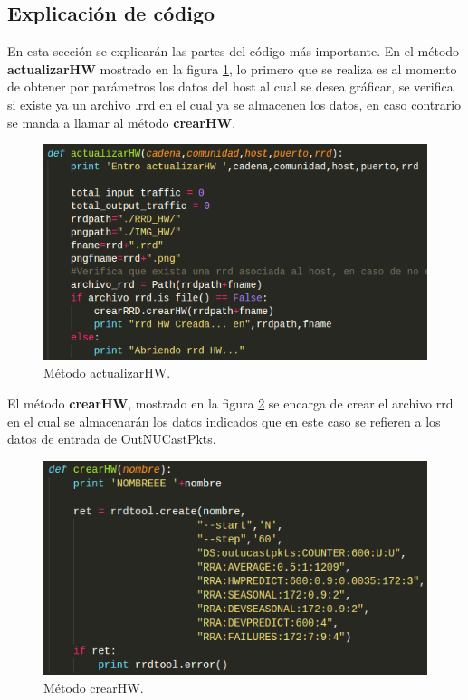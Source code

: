 \subsection{Explicación de código}
En esta sección se explicarán las partes del código más importante. En el método \textbf{actualizarHW} mostrado en la figura \ref{image:codigo4}, lo primero que se realiza es al momento de obtener por parámetros los datos del host al cual se desea gráficar, se verifica si existe ya un archivo .rrd en el cual ya se almacenen los datos, en caso contrario se manda a llamar al método \textbf{crearHW}.
\FloatBarrier
\begin{figure}[htbp!]
		\centering
			\includegraphics[width=.7 \textwidth]{images/codigo4}
		\caption{Método actualizarHW.}
		\label{image:codigo4}
\end{figure}
\FloatBarrier


El método \textbf{crearHW}, mostrado en la figura \ref{image:codigo1} se encarga de crear el archivo rrd en el cual se almacenarán los datos indicados que en este caso se refieren a los datos de entrada de OutNUCastPkts.
\FloatBarrier
\begin{figure}[htbp!]
		\centering
			\includegraphics[width=.7 \textwidth]{images/codigo1}
		\caption{Método crearHW.}
		\label{image:codigo1}
\end{figure}
\FloatBarrier




